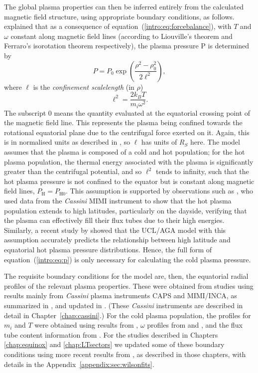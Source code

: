The global plasma properties can then be inferred entirely from the calculated magnetic field structure, using appropriate boundary conditions, as follows. \citet{caudal1986} explained that as a consequence of equation~(\ref{intro:eq:forcebalance}), with $T$ and $\omega$ constant along magnetic field lines (according to Liouville's theorem and Ferraro's isorotation theorem respectively), the plasma pressure P is determined by 
\begin{equation}\label{intro:eq:p}
P = P_{0}\exp\left(\frac{\rho^2-\rho_0^2}{2\ell^2}\right),
\end{equation}
where $\ell$ is the \textit{confinement scalelength} (in $\rho$)
\begin{equation}
\ell^2 = \frac{2k_BT}{m_i\omega^2}.
\end{equation}
The subscript 0 means the quantity evaluated at the equatorial crossing point of the magnetic field line. This represents the plasma being confined towards the rotational equatorial plane due to the centrifugal force exerted on it. Again, this is in normalised units as described in \citet{achilleos2010a}, so $\ell$ has units of $\si{R_S}$ here. The model assumes that the plasma is composed of a cold and hot population; for the hot plasma population, the thermal energy associated with the plasma is significantly greater than the centrifugal potential, and so $\ell^2$ tends to infinity, such that the hot plasma pressure is not confined to the equator but is constant along magnetic field lines, $P_\mathrm{H} = P_\mathrm{H0}$. This assumption is supported by observations such as \citet{krimigis2007}, who used data from the \textit{Cassini} MIMI instrument to show that the hot plasma population extends to high latitudes, particularly on the dayside, verifying that the plasma can effectively fill their flux tubes due to their high energies. Similarly, a recent study by \citet{sergis2018} showed that the UCL/AGA model with this assumption accurately predicts the relationship between high latitude and equatorial hot plasma pressure distributions. Hence, the full form of equation~(\ref{intro:eq:p}) is only necessary for calculating the cold plasma pressure.

The requisite boundary conditions for the model are, then, the equatorial radial profiles of the relevant plasma properties. These were obtained from studies using results mainly from \textit{Cassini} plasma instruments CAPS and MIMI/INCA, as summarized in \citet{achilleos2010a}, and updated in \citet{achilleos2010b}. (These \textit{Cassini} instruments are described in detail in Chapter~\ref{chap:cassini}.) For the cold plasma population, the profiles for $m_i$ and $T$ were obtained using results from \citet{wilson2008}, $\omega$ profiles from \citet{wilson2008} and \citet{kane2008}, and the flux tube content information from \citet{mcandrews2009}. For the studies described in Chapters \ref{chap:equinox} and \ref{chap:LTsectors} we updated some of these boundary conditions using more recent results from \citet{wilson2017}, as described in those chapters, with details in the Appendix~\ref{appendix:sec:wilsonfits}.

